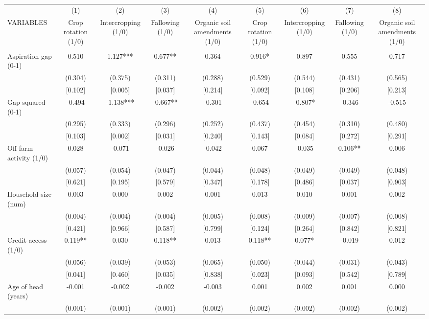 \documentclass[]{article}
\begin{document}
\begin{tabular}{lcccccccc} \hline
 & (1) & (2) & (3) & (4) & (5) & (6) & (7) & (8) \\
VARIABLES & Crop rotation (1/0) & Intercropping (1/0) & Fallowing (1/0) & Organic soil amendments (1/0) & Crop rotation (1/0) & Intercropping (1/0) & Fallowing (1/0) & Organic soil amendments (1/0) \\ \hline
 &  &  &  &  &  &  &  &  \\
Aspiration gap (0-1) & 0.510 & 1.127*** & 0.677** & 0.364 & 0.916* & 0.897 & 0.555 & 0.717 \\
 & (0.304) & (0.375) & (0.311) & (0.288) & (0.529) & (0.544) & (0.431) & (0.565) \\
 & [0.102] & [0.005] & [0.037] & [0.214] & [0.092] & [0.108] & [0.206] & [0.213] \\
Gap squared (0-1) & -0.494 & -1.138*** & -0.667** & -0.301 & -0.654 & -0.807* & -0.346 & -0.515 \\
 & (0.295) & (0.333) & (0.296) & (0.252) & (0.437) & (0.454) & (0.310) & (0.480) \\
 & [0.103] & [0.002] & [0.031] & [0.240] & [0.143] & [0.084] & [0.272] & [0.291] \\
Off-farm activity (1/0) & 0.028 & -0.071 & -0.026 & -0.042 & 0.067 & -0.035 & 0.106** & 0.006 \\
 & (0.057) & (0.054) & (0.047) & (0.044) & (0.048) & (0.049) & (0.049) & (0.048) \\
 & [0.621] & [0.195] & [0.579] & [0.347] & [0.178] & [0.486] & [0.037] & [0.903] \\
Household size (num) & 0.003 & 0.000 & 0.002 & 0.001 & 0.013 & 0.010 & 0.001 & 0.002 \\
 & (0.004) & (0.004) & (0.004) & (0.005) & (0.008) & (0.009) & (0.007) & (0.008) \\
 & [0.421] & [0.966] & [0.587] & [0.799] & [0.124] & [0.264] & [0.842] & [0.821] \\
Credit access (1/0) & 0.119** & 0.030 & 0.118** & 0.013 & 0.118** & 0.077* & -0.019 & 0.012 \\
 & (0.056) & (0.039) & (0.053) & (0.065) & (0.050) & (0.044) & (0.031) & (0.043) \\
 & [0.041] & [0.460] & [0.035] & [0.838] & [0.023] & [0.093] & [0.542] & [0.789] \\
Age of head (years) & -0.001 & -0.002 & -0.002 & -0.003 & 0.001 & 0.002 & 0.001 & 0.000 \\
 & (0.001) & (0.001) & (0.001) & (0.002) & (0.002) & (0.002) & (0.002) & (0.002) \\

\end{tabular}
\end{document}
